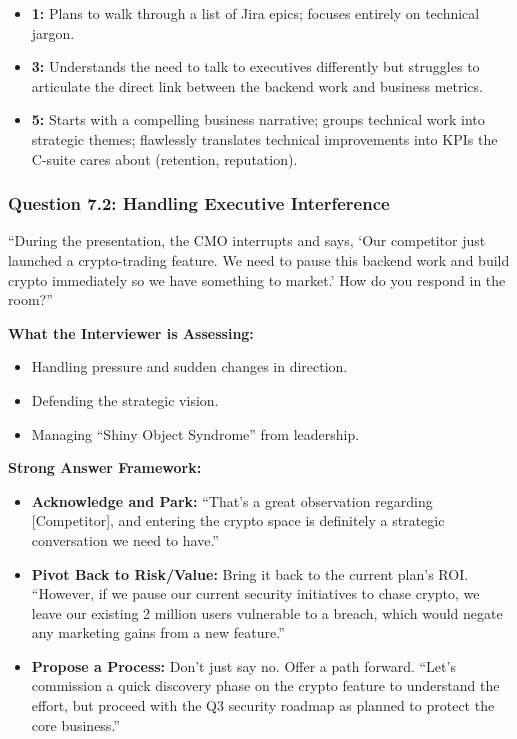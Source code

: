 \begin{itemize}
\tightlist
\item
  \textbf{1:} Plans to walk through a list of Jira epics; focuses
  entirely on technical jargon.
\item
  \textbf{3:} Understands the need to talk to executives differently but
  struggles to articulate the direct link between the backend work and
  business metrics.
\item
  \textbf{5:} Starts with a compelling business narrative; groups
  technical work into strategic themes; flawlessly translates technical
  improvements into KPIs the C-suite cares about (retention,
  reputation).
\end{itemize}

\subsubsection{Question 7.2: Handling Executive
Interference}\label{question-7.2-handling-executive-interference}

``During the presentation, the CMO interrupts and says, `Our competitor
just launched a crypto-trading feature. We need to pause this backend
work and build crypto immediately so we have something to market.' How
do you respond in the room?''

\textbf{What the Interviewer is Assessing:}

\begin{itemize}
\tightlist
\item
  Handling pressure and sudden changes in direction.
\item
  Defending the strategic vision.
\item
  Managing ``Shiny Object Syndrome'' from leadership.
\end{itemize}

\textbf{Strong Answer Framework:}

\begin{itemize}
\tightlist
\item
  \textbf{Acknowledge and Park:} ``That's a great observation regarding
  {[}Competitor{]}, and entering the crypto space is definitely a
  strategic conversation we need to have.''
\item
  \textbf{Pivot Back to Risk/Value:} Bring it back to the current plan's
  ROI. ``However, if we pause our current security initiatives to chase
  crypto, we leave our existing 2 million users vulnerable to a breach,
  which would negate any marketing gains from a new feature.''
\item
  \textbf{Propose a Process:} Don't just say no. Offer a path forward.
  ``Let's commission a quick discovery phase on the crypto feature to
  understand the effort, but proceed with the Q3 security roadmap as
  planned to protect the core business.''
\end{itemize}


